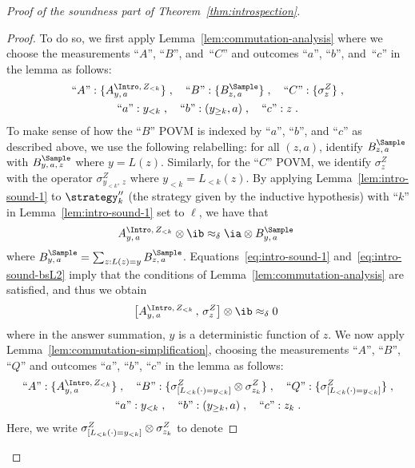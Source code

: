 \begin{proof}[Proof of the soundness part of Theorem~\ref{thm:introspection}]
\begin{proof}
    To do so, we first apply Lemma~\ref{lem:commutation-analysis} where we
    choose the measurements ``$A$'', ``$B$'', and~``$C$'' and outcomes ``$a$'',
    ``$b$'', and~``$c$'' in the lemma as follows:
    \begin{gather*}
      \text{``$A$''}: \{\aizk\}\;,\quad
      \text{``$B$''}: \{\bs[z, \, a]\}\;,\quad
      \text{``$C$''}: \{\z  \}\;, \\
      \text{``$a$''}: y_{< k} \;, \quad
      \text{``$b$''}: (y_{\geq k},a) \;, \quad
      \text{``$c$''}: z \;.
    \end{gather*}
    To make sense of how the ``$B$'' POVM is indexed by ``$a$'', ``$b$'', and
    ``$c$'' as described above, we use the following relabelling: for all
    $(z,a)$, identify $\bs[z,\, a]$ with $\bs[y,\, a,\, z]$ where $y =
    L(z)$.
    Similarly, for the ``$C$'' POVM, we identify $\sigma^Z_z$ with the operator
    $\sigma^Z_{y_{<k},\, z}$ where $y_{<k} = L_{<k}(z)$.
    By applying Lemma~\ref{lem:intro-sound-1} to $\strategy_k''$ (the strategy
    given by the inductive hypothesis) with ``$k$'' in
    Lemma~\ref{lem:intro-sound-1} set to $\ell$, we have that
    \begin{equation}
      \label{eq:intro-sound-bsL2}
      \aizk \otimes \ib \approx_\delta \ia \otimes \bs[y,\, a]\;
    \end{equation}
    where $\bs[y,\, a] = \sum_{z: L(z) = y} \bs[z,\, a]$.
    Equations~\eqref{eq:intro-sound-1} and~\eqref{eq:intro-sound-bsL2} imply that the
    conditions of Lemma~\ref{lem:commutation-analysis} are satisfied, and thus
    we obtain
    \begin{equation}\label{eq:commute-with-Z}
      \bigl[\aizk \,,\, \z \bigr] \otimes \ib \approx_\delta 0\;
    \end{equation}
    where in the answer summation, $y$ is a deterministic function of $z$.
    We now apply Lemma~\ref{lem:commutation-simplification}, choosing the
    measurements ``$A$'', ``$B$'', ``$Q$'' and outcomes ``$a$'', ``$b$'',
    ``$c$'' in the lemma as follows:
    \begin{gather*}
      \text{``$A$''}: \{\aizk\}\;,\quad
      \text{``$B$''}: \{\z[\Llk] \otimes \z[z_k] \}\;, \quad
      \text{``$Q$''}: \{\z[\Llk] \}\;, \\
      \text{``$a$''}: y_{< k} \;, \quad
      \text{``$b$''}: (y_{\geq k}, a) \;, \quad
      \text{``$c$''}: z_k \;.
    \end{gather*}
     Here, we write $\z[\Llk] \otimes \z[z_k]$ to denote

\end{proof}
\end{proof}
